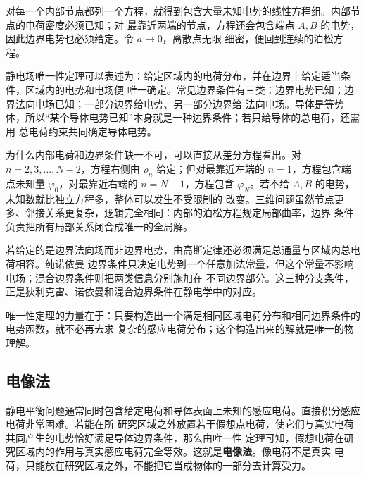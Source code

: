 {\par\noindent\begin{minipage}{\linewidth}
\discretePotentialFigure
{}\label{ch20:fig:s34-3-4}
\end{minipage}\par\medskip

对每一个内部节点都列一个方程，就得到包含大量未知电势的线性方程组。内部节点的电荷密度必须已知；对
最靠近两端的节点，方程还会包含端点 $A,B$ 的电势，因此边界电势也必须给定。令 $a\to0$，离散点无限
细密，便回到连续的泊松方程。

静电场唯一性定理可以表述为：给定区域内的电荷分布，并在边界上给定适当条件，区域内的电势和电场便
唯一确定。常见边界条件有三类：边界电势已知；边界法向电场已知；一部分边界给电势、另一部分边界给
法向电场。导体是等势体，所以“某个导体电势已知”本身就是一种边界条件；若只给导体的总电荷，还需用
总电荷约束共同确定导体电势。

为什么内部电荷和边界条件缺一不可，可以直接从差分方程看出。对 $n=2,3,\ldots,N-2$，方程右侧由
$\rho_n$ 给定；但对最靠近左端的 $n=1$，方程包含端点未知量 $\varphi_0$，对最靠近右端的
$n=N-1$，方程包含 $\varphi_N$。若不给 $A,B$ 的电势，未知数就比独立方程多，整体可以发生不受限制的
改变。三维问题虽然节点更多、邻接关系更复杂，逻辑完全相同：内部的泊松方程规定局部曲率，边界
条件负责把所有局部关系闭合成唯一的全局解。

若给定的是边界法向场而非边界电势，由高斯定律还必须满足总通量与区域内总电荷相容。纯诺依曼
边界条件只决定电势到一个任意加法常量，但这个常量不影响电场；混合边界条件则把两类信息分别施加在
不同边界部分。这三种分支条件，正是狄利克雷、诺依曼和混合边界条件在静电学中的对应。

唯一性定理的力量在于：只要构造出一个满足相同区域电荷分布和相同边界条件的电势函数，就不必再去求
复杂的感应电荷分布；这个构造出来的解就是唯一的物理解。


\subsection{电像法}


静电平衡问题通常同时包含给定电荷和导体表面上未知的感应电荷。直接积分感应电荷非常困难。若能在所
研究区域之外放置若干假想点电荷，使它们与真实电荷共同产生的电势恰好满足导体边界条件，那么由唯一性
定理可知，假想电荷在研究区域内的作用与真实感应电荷完全等效。这就是\textbf{电像法}。像电荷不是真实
电荷，只能放在研究区域之外，不能把它当成物体的一部分去计算受力。

}

